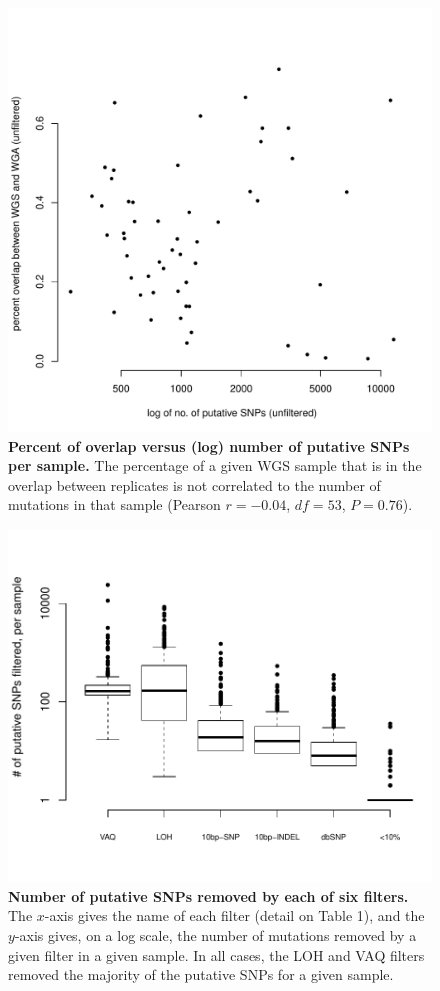 \documentclass[11pt]{article} %
\begin{document}
\begin{figure}
\centerline{
\includegraphics[width=5in]{unfiltered_total_muts_v_percent_overlap.pdf} }
\caption{\textbf{Percent of overlap versus (log) number of putative SNPs per sample.} The percentage of a given WGS sample that is in the overlap between replicates is not correlated to the number of mutations in that sample (Pearson $r=-0.04$, $df=53$, $P=0.76$).}
\label{fig:unfiltered_total_muts}
\end{figure}

\begin{figure}
\centerline{
\includegraphics[width=6in]{boxplot_number_filtered.pdf} }
\caption{\textbf{Number of putative SNPs removed by each of six filters.} The $x$-axis gives the name of each filter (detail on Table 1), and the $y$-axis gives, on a log scale, the number of mutations removed by a given filter in a given sample. In all cases, the LOH and VAQ filters removed the majority of the putative SNPs for a given sample.}
\label{fig:boxplot_number_filtered}
\end{figure}
\end{document}
